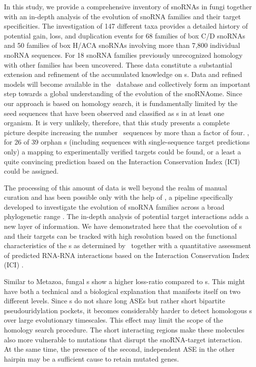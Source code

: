 
In this study, we provide a comprehensive inventory of snoRNAs in fungi
together with an in-depth analysis of the evolution of snoRNA families and
their target specificities. The investigation of 147 different taxa
provides a detailed history of potential gain, loss, and duplication events
for 68 families of box C/D snoRNAs and 50 families of box H/ACA snoRNAs
involving more than 7,800 individual snoRNA sequences. For 18 snoRNA
families previously unrecognized homology with other families has been
uncovered. These data constitute a substantial extension and refinement of
the accumulated knowledge on \sno{}s. Data and refined models will become
available in the \rfam\ database and collectively form an important step
towards a global understanding of the evolution of the snoRNAome. Since our
approach is based on homology search, it is fundamentally limited by the
seed sequences that have been observed and classified as \sno{}s in at
least one organism. It is very unlikely, therefore, that this study
presents a complete picture despite increasing the number \sno\ sequences
by more than a factor of four. , for 26 of 39 orphan \sno
s (including sequences with single-sequence target predictions only) a
mapping to experimentally verified targets could be found, or a least a
quite convincing prediction based on the Interaction Conservation Index
(ICI) could be assigned.

The processing of this amount of data is well beyond the realm of manual
curation and has been possible only with the help of \snostrip, a pipeline
specifically developed to investigate the evolution of snoRNA families
across a broad phylogenetic range \cite{Bartschat:2014}.  The in-depth
analysis of potential target interactions adds a new layer of
information. We have demonstrated here that the coevolution of \sno s and
their targets can be tracked with high resolution based on the functional
characteristics of the \sno s as determined by \snostrip\ together with a
quantitative assessment of predicted RNA-RNA interactions based on the 
Interaction Conservation Index (ICI) \cite{Kehr:2014}.

Similar to Metazoa, fungal \haca s show a higher loss-ratio compared
to \cd s. This might have both a technical and a biological
explanation that manifests itself on two different levels. Since \haca
s do not share long ASEs but rather short bipartite pseudouridylation
pockets, it becomes considerably harder to detect homologous \sno s
over large evolutionary timescales. This effect may limit the scope of
the homology search procedure. The short interacting regions make
these molecules also more vulnerable to mutations that disrupt the
snoRNA-target interaction. At the same time, the presence of the
second, independent ASE in the other hairpin may be a sufficient cause
to retain mutated genes.

